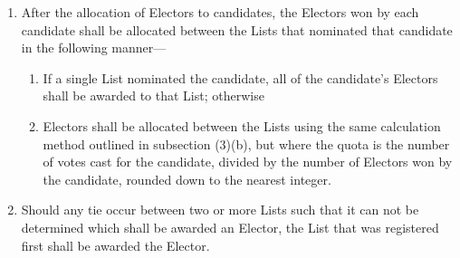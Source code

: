 \documentclass{article}
\begin{document}
    \begin{enumerate}
        \item After the allocation of Electors to candidates, the Electors won by each candidate shall be allocated between the Lists that nominated that candidate in the following manner---
        \begin{enumerate}
            \item If a single List nominated the candidate, all of the candidate's Electors shall be awarded to that List; otherwise
            \item Electors shall be allocated between the Lists using the same calculation method outlined in subsection (3)(b), but where the quota is the number of votes cast for the candidate, divided by the number of Electors won by the candidate, rounded down to the nearest integer.
        \end{enumerate}
        \item Should any tie occur between two or more Lists such that it can not be determined which
        shall be awarded an Elector, the List that was registered first shall be awarded the Elector.
    \end{enumerate}
\end{document}
